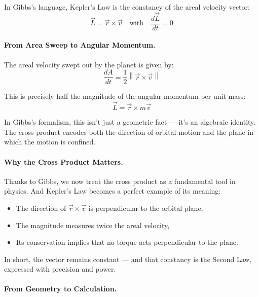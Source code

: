 \bigskip

\begin{tcolorbox}[colback=blue!5!white, colframe=blue!70!black, title=\textbf{Gibbs’s View: Kepler as a Vector Conservation Law}]
In Gibbs’s language, Kepler’s Law is the constancy of the areal velocity vector:
\[
\vec{L} = \vec{r} \times \vec{v}
\quad \text{with} \quad
\frac{d\vec{L}}{dt} = 0
\]
\end{tcolorbox}

\bigskip

\paragraph{From Area Sweep to Angular Momentum.}

The areal velocity swept out by the planet is given by:
\[
\frac{dA}{dt} = \frac{1}{2} \left\| \vec{r} \times \vec{v} \right\|
\]

This is precisely half the magnitude of the angular momentum per unit mass:
\[
\vec{L} = \vec{r} \times m\vec{v}
\]

In Gibbs’s formalism, this isn’t just a geometric fact — it’s an algebraic identity.  
The cross product encodes both the direction of orbital motion and the plane in which the motion is confined.

\bigskip

\paragraph{Why the Cross Product Matters.}

Thanks to Gibbs, we now treat the cross product as a fundamental tool in physics.  
And Kepler’s Law becomes a perfect example of its meaning:

\begin{itemize}
    \item The direction of \( \vec{r} \times \vec{v} \) is perpendicular to the orbital plane,
    \item The magnitude measures twice the areal velocity,
    \item Its conservation implies that no torque acts perpendicular to the plane.
\end{itemize}

In short, the vector remains constant — and that constancy is the Second Law, expressed with precision and power.

\bigskip

\paragraph{From Geometry to Calculation.}

